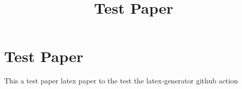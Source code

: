 \documentclass{article}
\title{Test Paper}
\begin{document}
\maketitle

\section{Test Paper}

This a test paper latex paper to the test the latex-generator github action
\end{document}
